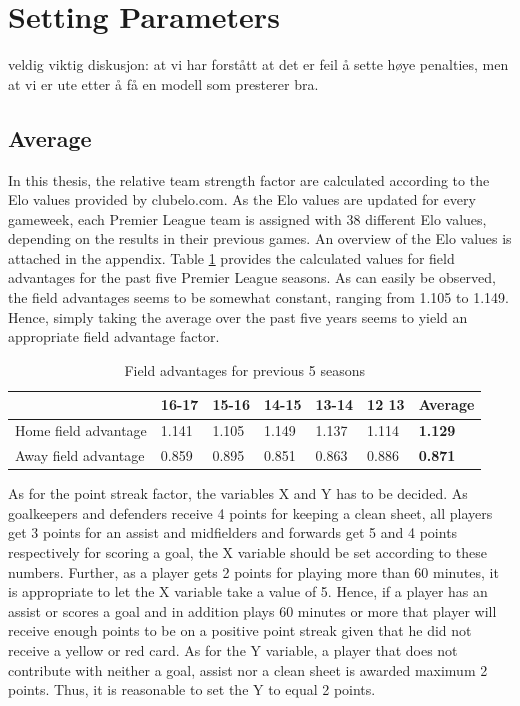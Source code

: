 \section{Setting Parameters}
veldig viktig diskusjon: 
at vi har forstått at det er feil å sette høye penalties, men at vi er ute etter å få en modell som presterer bra. 
\subsection{Average}
In this thesis, the relative team strength factor are calculated according to the Elo values provided by clubelo.com. As the Elo values are updated for every gameweek, each Premier League team is assigned with 38 different Elo values, depending on the results in their previous games. An overview of the Elo values is attached in the appendix. 
\newpar
Table \ref{Field advantage} provides the calculated values for field advantages for the past five Premier League seasons. As can easily be observed, the field advantages seems to be somewhat constant, ranging from 1.105 to 1.149. Hence, simply taking the average over the past five years seems to yield an appropriate field advantage factor. 

\begin{table}[H]
\centering
\caption{Field advantages for previous 5 seasons}
\label{Field advantage}
\begin{tabular}{|l|l|l|l|l|l|l|}
\hline
          & 16-17    & 15-16    & 14-15    & 13-14    & 12 13 & \textbf{Average}   \\
          \hline
        
Home field advantage & 1.141 & 1.105 & 1.149 & 1.137 & 1.114 & \textbf{1.129} \\
\hline
Away field advantage & 0.859 & 0.895 & 0.851 & 0.863 & 0.886 & \textbf{0.871} \\
\hline
\end{tabular}
\end{table}

As for the point streak factor, the variables X and Y has to be decided. As goalkeepers and defenders receive 4 points for keeping a clean sheet, all players get 3 points for an assist and midfielders and forwards get 5 and 4 points respectively for scoring a goal, the X variable should be set according to these numbers. Further, as a player gets 2 points for playing more than 60 minutes, it is appropriate to let the X variable take a value of 5. Hence, if a player has an assist or scores a goal and in addition plays 60 minutes or more that player will receive enough points to be on a positive point streak given that he did not receive a yellow or red card. As for the Y variable, a player that does not contribute with neither a goal, assist nor a clean sheet is awarded maximum 2 points. Thus, it is reasonable to set the Y to equal 2 points. 

